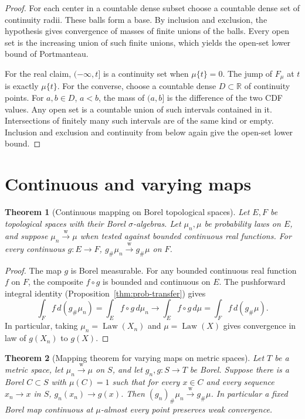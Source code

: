 \documentclass[11pt,oneside,openany]{book}
\newcommand{\R}{\mathbb{R}}
\DeclareMathOperator{\Law}{Law}
\newcommand{\weakto}{\xrightarrow{\mathrm{w}}}
\theoremstyle{plain}
\newtheorem{theorem}{Theorem}[chapter]
\theoremstyle{definition}
\theoremstyle{remark}
\begin{document}
\begin{proof}
For each center in a countable dense subset choose a countable dense
set of continuity radii. These balls form a base. By inclusion and
exclusion, the hypothesis gives convergence of masses of finite unions
of the balls. Every open set is the increasing union of such finite
unions, which yields the open-set lower bound of Portmanteau.

For the real claim, \((-\infty,t]\) is a continuity set when \(\mu\{t\}=0\).
The jump of \(F_\mu\) at \(t\) is exactly \(\mu\{t\}\). For the converse,
choose a countable dense \(D\subset\R\) of continuity points. For
\(a,b\in D\), \(a<b\), the mass of \((a,b]\) is the difference of the two
CDF values. Any open set is a countable union of such intervals
contained in it. Intersections of finitely many such intervals are of
the same kind or empty. Inclusion and exclusion and continuity from
below again give the open-set lower bound.
\end{proof}

\section{Continuous and varying maps}
\label{p06-03}

\begin{theorem}[Continuous mapping on Borel topological spaces]
\label{thm:p06-continuous-mapping}
Let \(E,F\) be topological spaces with their Borel \(\sigma\)-algebras.
Let \(\mu_n,\mu\) be probability laws on \(E\), and suppose
\(\mu_n\weakto\mu\) when tested against bounded continuous real functions.
For every continuous \(g:E\to F\),
\(g_\#\mu_n\weakto g_\#\mu\) on \(F\).
\end{theorem}

\begin{proof}
The map \(g\) is Borel measurable. For any bounded continuous real
function \(f\) on \(F\), the composite \(f\circ g\) is bounded and
continuous on \(E\). The pushforward integral identity
(Proposition~\ref{thm:prob-transfer}) gives
\[
 \int_F f\,d(g_\#\mu_n)=\int_E f\circ g\,d\mu_n
 \longrightarrow\int_E f\circ g\,d\mu=\int_F f\,d(g_\#\mu).
\]
In particular, taking \(\mu_n=\Law(X_n)\) and \(\mu=\Law(X)\)
gives convergence in law of \(g(X_n)\) to \(g(X)\).
\end{proof}

\begin{theorem}[Mapping theorem for varying maps on metric spaces]
\label{thm:p06-mapping}
Let \(T\) be a metric space, let \(\mu_n\weakto\mu\) on \(S\), and let
\(g_n,g:S\to T\) be Borel. Suppose there is a Borel \(C\subset S\) with
\(\mu(C)=1\) such that for every \(x\in C\) and every sequence
\(x_n\to x\) in \(S\), \(g_n(x_n)\to g(x)\). Then
\((g_n)_\#\mu_n\weakto g_\#\mu\). In particular a fixed Borel map
continuous at \(\mu\)-almost every point preserves weak convergence.
\end{theorem}
\end{document}
